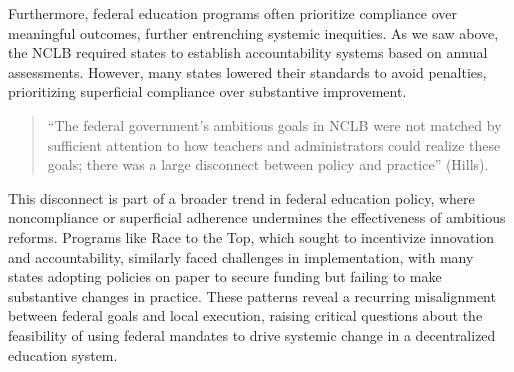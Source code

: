 \documentclass[11pt]{extarticle}
\begin{document}
Furthermore, federal education programs often prioritize compliance over meaningful outcomes, further entrenching systemic inequities. As we saw above, the NCLB required states to establish accountability systems based on annual assessments. However, many states lowered their standards to avoid penalties, prioritizing superficial compliance over substantive improvement.
\begin{quote}
``The federal government’s ambitious goals in NCLB were not matched by sufficient attention to how teachers and administrators could realize these goals; there was a large disconnect between policy and practice” (Hills).
\end{quote}
This disconnect is part of a broader trend in federal education policy, where noncompliance or superficial adherence undermines the effectiveness of ambitious reforms. Programs like Race to the Top, which sought to incentivize innovation and accountability, similarly faced challenges in implementation, with many states adopting policies on paper to secure funding but failing to make substantive changes in practice. These patterns reveal a recurring misalignment between federal goals and local execution, raising critical questions about the feasibility of using federal mandates to drive systemic change in a decentralized education system.
\end{document}
